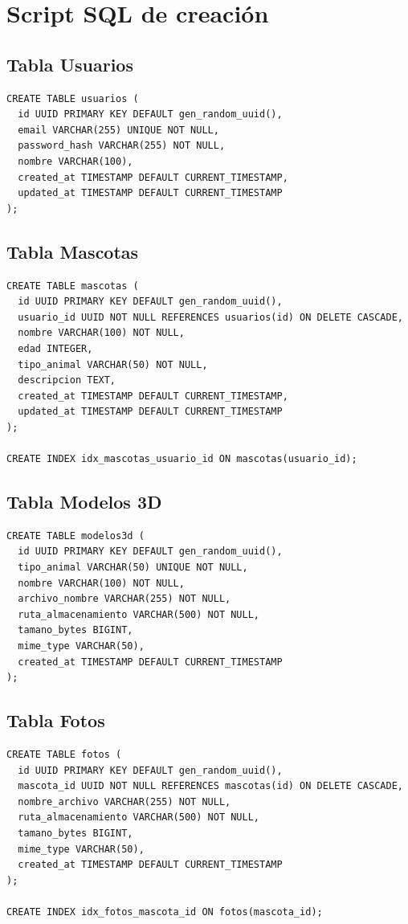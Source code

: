 \documentclass[12pt,a4paper]{article}
\begin{document}
\section{Script SQL de creaci\'on}

\subsection{Tabla Usuarios}
\begin{verbatim}
CREATE TABLE usuarios (
  id UUID PRIMARY KEY DEFAULT gen_random_uuid(),
  email VARCHAR(255) UNIQUE NOT NULL,
  password_hash VARCHAR(255) NOT NULL,
  nombre VARCHAR(100),
  created_at TIMESTAMP DEFAULT CURRENT_TIMESTAMP,
  updated_at TIMESTAMP DEFAULT CURRENT_TIMESTAMP
);
\end{verbatim}

\subsection{Tabla Mascotas}
\begin{verbatim}
CREATE TABLE mascotas (
  id UUID PRIMARY KEY DEFAULT gen_random_uuid(),
  usuario_id UUID NOT NULL REFERENCES usuarios(id) ON DELETE CASCADE,
  nombre VARCHAR(100) NOT NULL,
  edad INTEGER,
  tipo_animal VARCHAR(50) NOT NULL,
  descripcion TEXT,
  created_at TIMESTAMP DEFAULT CURRENT_TIMESTAMP,
  updated_at TIMESTAMP DEFAULT CURRENT_TIMESTAMP
);

CREATE INDEX idx_mascotas_usuario_id ON mascotas(usuario_id);
\end{verbatim}

\subsection{Tabla Modelos 3D}
\begin{verbatim}
CREATE TABLE modelos3d (
  id UUID PRIMARY KEY DEFAULT gen_random_uuid(),
  tipo_animal VARCHAR(50) UNIQUE NOT NULL,
  nombre VARCHAR(100) NOT NULL,
  archivo_nombre VARCHAR(255) NOT NULL,
  ruta_almacenamiento VARCHAR(500) NOT NULL,
  tamano_bytes BIGINT,
  mime_type VARCHAR(50),
  created_at TIMESTAMP DEFAULT CURRENT_TIMESTAMP
);
\end{verbatim}

\subsection{Tabla Fotos}
\begin{verbatim}
CREATE TABLE fotos (
  id UUID PRIMARY KEY DEFAULT gen_random_uuid(),
  mascota_id UUID NOT NULL REFERENCES mascotas(id) ON DELETE CASCADE,
  nombre_archivo VARCHAR(255) NOT NULL,
  ruta_almacenamiento VARCHAR(500) NOT NULL,
  tamano_bytes BIGINT,
  mime_type VARCHAR(50),
  created_at TIMESTAMP DEFAULT CURRENT_TIMESTAMP
);

CREATE INDEX idx_fotos_mascota_id ON fotos(mascota_id);
\end{verbatim}
\end{document}
